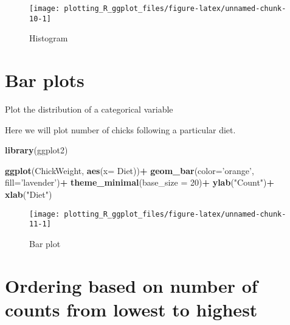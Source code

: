 \documentclass[
]{book}
\newenvironment{Shaded}{\begin{snugshade}}{\end{snugshade}}
\newcommand{\DataTypeTok}[1]{\textcolor[rgb]{0.13,0.29,0.53}{#1}}
\newcommand{\DecValTok}[1]{\textcolor[rgb]{0.00,0.00,0.81}{#1}}
\newcommand{\KeywordTok}[1]{\textcolor[rgb]{0.13,0.29,0.53}{\textbf{#1}}}
\newcommand{\NormalTok}[1]{#1}
\newcommand{\OperatorTok}[1]{\textcolor[rgb]{0.81,0.36,0.00}{\textbf{#1}}}
\newcommand{\StringTok}[1]{\textcolor[rgb]{0.31,0.60,0.02}{#1}}
\begin{document}
\begin{figure}

{\centering \texttt{[image: plotting\_R\_ggplot\_files/figure-latex/unnamed-chunk-10-1]} 

}

\caption{Histogram}\label{fig:unnamed-chunk-10}
\end{figure}

\hypertarget{bar-plots}{%
\section{Bar plots}\label{bar-plots}}

Plot the distribution of a categorical variable

Here we will plot number of chicks following a particular diet.

\begin{Shaded}
\begin{Highlighting}[]
\KeywordTok{library}\NormalTok{(ggplot2)}

\KeywordTok{ggplot}\NormalTok{(ChickWeight, }\KeywordTok{aes}\NormalTok{(}\DataTypeTok{x=}\NormalTok{ Diet))}\OperatorTok{+}
\StringTok{  }\KeywordTok{geom_bar}\NormalTok{(}\DataTypeTok{color=}\StringTok{'orange'}\NormalTok{, }\DataTypeTok{fill=}\StringTok{'lavender'}\NormalTok{)}\OperatorTok{+}
\StringTok{  }\KeywordTok{theme_minimal}\NormalTok{(}\DataTypeTok{base_size =} \DecValTok{20}\NormalTok{)}\OperatorTok{+}
\StringTok{  }\KeywordTok{ylab}\NormalTok{(}\StringTok{"Count"}\NormalTok{)}\OperatorTok{+}\StringTok{ }\KeywordTok{xlab}\NormalTok{(}\StringTok{"Diet"}\NormalTok{)}
\end{Highlighting}
\end{Shaded}

\begin{figure}

{\centering \texttt{[image: plotting\_R\_ggplot\_files/figure-latex/unnamed-chunk-11-1]} 

}

\caption{Bar plot}\label{fig:unnamed-chunk-11}
\end{figure}

\hypertarget{ordering-based-on-number-of-counts-from-lowest-to-highest}{%
\section{Ordering based on number of counts from lowest to highest}\label{ordering-based-on-number-of-counts-from-lowest-to-highest}}
\end{document}
